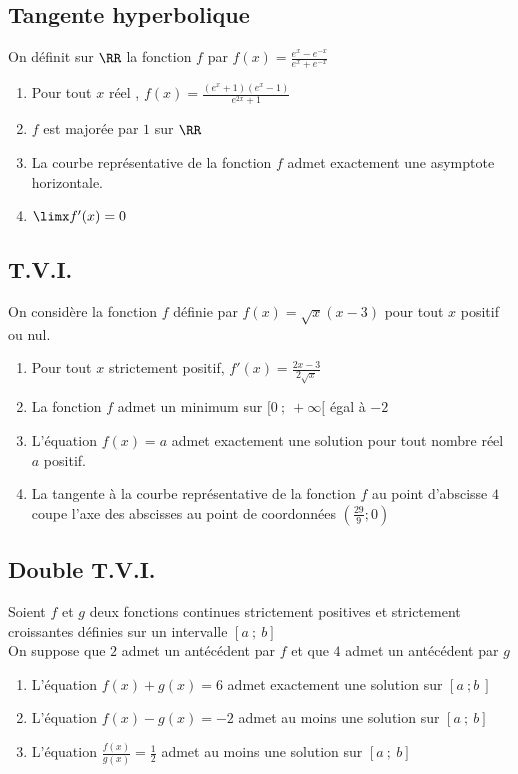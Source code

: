 \documentclass[oneside,12pt]{article}
\begin{document}
\subsection{Tangente hyperbolique}
On définit sur $\RR$ la fonction $f$ par $f(x)=\frac{e^x-e^{-x}}{e^x+e^{-x}}$
\begin{enumerate}
	\item Pour tout $x$ réel , $f(x)=\frac{(e^x+1)(e^x-1)}{e^{2x}+1}$
	\item $f$ est majorée par $1$ sur $\RR$
	\item La courbe représentative de la fonction $f$ admet exactement une asymptote horizontale.
	\item $\limx f'(x) = 0$
\end{enumerate}



\subsection{T.V.I.}
On considère la fonction $f$ définie par $f(x)=\sqrt{x}(x-3)$ pour tout $x$ positif ou nul.
\begin{enumerate}
	\item Pour tout $x$ strictement positif, $f'(x)=\frac{2x-3}{2\sqrt{x}}$
	\item La fonction $f$ admet un minimum  sur $[0~;~+\infty[$ égal à $-2$ 
	\item L'équation $f(x)=a$ admet exactement une solution pour tout nombre réel $a$ positif.
	\item La tangente à la courbe représentative de la fonction $f$ au point d'abscisse $4$ coupe l'axe des abscisses au point de coordonnées $\left(\frac{29}{9};0\right)$
\end{enumerate}



\subsection{Double T.V.I.}
Soient $f$ et $g$ deux fonctions continues strictement positives et strictement croissantes définies sur un intervalle $[a~;~b]$\\
On suppose que $2$ admet un antécédent par $f$ et que $4$ admet un antécédent par $g$
\begin{enumerate}
    \item L'équation $f(x)+g(x)=6$ admet exactement une solution sur $[a~;b~]$
    \item L'équation $f(x)-g(x)=-2$ admet au moins une solution sur $[a~;~b]$
    \item L'équation $\frac{f(x)}{g(x)}=\frac{1}{2}$ admet au moins une solution sur $[a~;~b]$
\end{enumerate}
\end{document}
